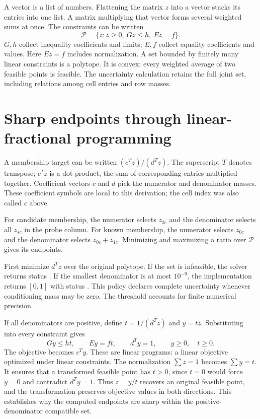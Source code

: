 \documentclass[11pt,a4paper]{report}
\newcommand{\code}[1]{\texttt{\detokenize{#1}}}
\begin{document}
A vector is a list of numbers. Flattening the matrix $z$ into a vector stacks its entries into one list. A matrix multiplying that vector forms several weighted sums at once. The constraints can be written
\begin{equation}
\mathcal P=\{z:z\geq0,\ Gz\leq h,\ Ez=f\}.
\end{equation}
$G,h$ collect inequality coefficients and limits; $E,f$ collect equality coefficients and values. Here $Ez=f$ includes normalization. A set bounded by finitely many linear constraints is a polytope. It is convex: every weighted average of two feasible points is feasible. The uncertainty calculation retains the full joint set, including relations among cell entries and row masses.

\section{Sharp endpoints through linear-fractional programming}
A membership target can be written $(c^Tz)/(d^Tz)$. The superscript $T$ denotes transpose; $c^Tz$ is a dot product, the sum of corresponding entries multiplied together. Coefficient vectors $c$ and $d$ pick the numerator and denominator masses. These coefficient symbols are local to this derivation; the cell index was also called $c$ above.

For candidate membership, the numerator selects $z_{2c}$ and the denominator selects all $z_{sc}$ in the probe column. For known membership, the numerator selects $z_{0c}$ and the denominator selects $z_{0c}+z_{1c}$. Minimizing and maximizing a ratio over $\mathcal P$ gives its endpoints.

First minimize $d^Tz$ over the original polytope. If the set is infeasible, the solver returns status \code{empty}. If the smallest denominator is at most $10^{-9}$, the implementation returns $[0,1]$ with status \code{undefined_denominator_policy}. This policy declares complete uncertainty whenever conditioning mass may be zero. The threshold accounts for finite numerical precision.

If all denominators are positive, define $t=1/(d^Tz)$ and $y=tz$. Substituting into every constraint gives
\begin{equation}
Gy\leq ht,\qquad Ey=ft,\qquad d^Ty=1,\qquad y\geq0,\quad t\geq0.
\label{eq:cc}
\end{equation}
The objective becomes $c^Ty$. These are linear programs: a linear objective optimized under linear constraints. The normalization $\sum z=1$ becomes $\sum y=t$. It ensures that a transformed feasible point has $t>0$, since $t=0$ would force $y=0$ and contradict $d^Ty=1$. Thus $z=y/t$ recovers an original feasible point, and the transformation preserves objective values in both directions. This establishes why the computed endpoints are sharp within the positive-denominator compatible set.
\end{document}

